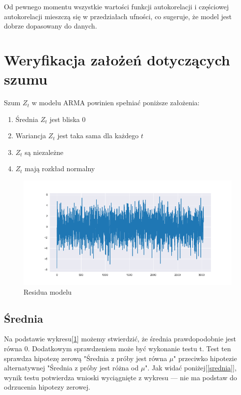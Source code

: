 \documentclass{article}
\theoremstyle{break}
\begin{document}
	Od pewnego momentu wszystkie wartości funkcji autokorelacji i częściowej autokorelacji mieszczą się w przedziałach ufności, co sugeruje, że model jest dobrze dopasowany do danych.
	
	
	\section{Weryfikacja założeń dotyczących szumu}
	
	Szum ${Z_t}$ w modelu ARMA powinien spełniać poniższe założenia:
	\begin{enumerate}
		\item Średnia ${Z_t}$ jest bliska 0
		\item Wariancja ${Z_t}$ jest taka sama dla każdego $t$
		\item ${Z_t}$ są niezależne
		\item ${Z_t}$ mają rozkład normalny
	\end{enumerate}
	
	\begin{figure}[H]
		\begin{center}
			\includegraphics[scale=0.63]{res.png}
			\caption{Residua modelu}
			\label{fig:res}
		\end{center}
	\end{figure}
	
	\subsection{Średnia}
	Na podstawie wykresu[\ref{fig:res}] możemy stwierdzić, że średnia prawdopodobnie jest równa 0. Dodatkowym sprawdzeniem może być wykonanie testu t. Test ten sprawdza hipotezę zerową "Średnia z próby jest równa $\mu$" przeciwko hipotezie alternatywnej "Średnia z próby jest różna od $\mu$". Jak widać poniżej[\ref{srednia}], wynik testu potwierdza wnioski wyciągnięte z wykresu — nie ma podstaw do odrzucenia hipotezy zerowej.
	
\end{document}
